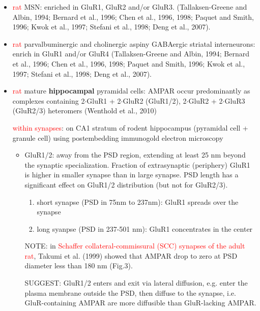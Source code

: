 \begin{itemize}
  \item \textcolor{red}{rat} MSN: enriched in GluR1, GluR2 and/or GluR3.
  (Tallaksen-Greene and Albin, 1994; Bernard et al., 1996; Chen et al., 1996,
  1998; Paquet and Smith, 1996; Kwok et al., 1997; Stefani et al., 1998; Deng et
  al., 2007).

  \item \textcolor{red}{rat} parvalbuminergic and cholinergic aspiny GABAergic
  striatal interneurons: enrich in GluR1 and/or GluR4 (Tallaksen-Greene and
  Albin, 1994; Bernard et al., 1996; Chen et al., 1996, 1998; Paquet and Smith,
  1996; Kwok et al., 1997; Stefani et al., 1998; Deng et al., 2007).

  \item \textcolor{red}{rat} mature {\bf hippocampal} pyramidal cells: AMPAR
  occur predominantly as complexes containing 2$\cdot$GluR1 + 2$\cdot$GluR2 (GluR1/2), 2$\cdot$GluR2 +
  2$\cdot$GluR3 (GluR2/3) heteromers (Wenthold et al., 2010)
  
  \textcolor{red}{within synapses}: \citep{jacob2015} on CA1 stratum of rodent
  hippocampus (pyramidal cell + granule cell) using postembedding immunogold
  electron microscopy
  \begin{itemize}
    \item GluR1/2: away from the PSD region, extending at least 25 nm beyond
    the synaptic specialization. Fraction of extrasynaptic (periphery) GluR1 is
    higher in smaller synapse than in large synapse. PSD length has a significant effect
    on GluR1/2 distribution (but not for GluR2/3).
    
    \begin{enumerate}
      \item short synapse (PSD in 75nm to 237nm): GluR1 spreads over the synapse
      \item long syanpse (PSD in 237-501 nm): GluR1 concentrates in the center
    \end{enumerate}
    NOTE: in \textcolor{red}{Schaffer collateral-commissural (SCC) synapses
    of the adult rat}, Takumi et al. (1999) showed that AMPAR drop to zero at
    PSD diameter less than 180 nm (Fig.3).
  
SUGGEST: GluR1/2 enters and exit via lateral diffusion, e.g. enter the plasma
membrane outside the PSD, then diffuse to the synapse, i.e. GluR-containing
AMPAR are more diffusible than GluR-lacking AMPAR.


\end{itemize}
\end{itemize}
